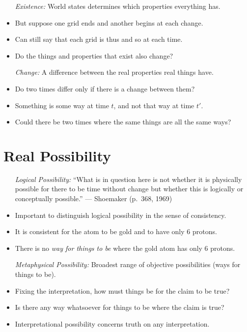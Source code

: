 \documentclass[a4paper, 11pt]{article} %
\begin{document}
\begin{itemize}
  \item[\it Existence:] World states determines which properties everything has.
    \item But suppose one grid ends and another begins at each change.
    \item Can still say that each grid is thus and so at each time.
    \item Do the things and properties that exist also change?
  \item[\it Change:] A difference between the real properties real things have.
    \item Do two times differ only if there is a change between them?
    \item Something is some way at time $t$, and not that way at time $t'$.
    \item Could there be two times where the same things are all the same ways?
\end{itemize}




\section*{Real Possibility}

\begin{itemize}
  \item[\it Logical Possibility:] ``What is in question here is not whether it is physically possible for there to be time without change but whether this is logically or conceptually possible.'' --- Shoemaker (p.~368, 1969)
    \item Important to distinguish logical possibility in the sense of consistency.
    \item It is consistent for the atom to be gold and to have only 6 protons.
    \item There is no \textit{way for things to be} where the gold atom has only 6 protons.
  \item[\it Metaphysical Possibility:] Broadest range of objective possibilities (ways for things to be).
    \item Fixing the interpretation, how must things be for the claim to be true?
    \item Is there any way whatsoever for things to be where the claim is true?
    \item Interpretational possibility concerns truth on any interpretation.
\end{itemize}
\end{document}
